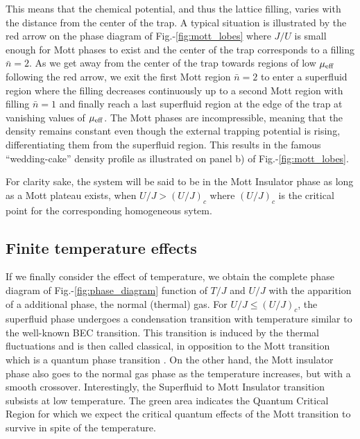 \noindent This means that the chemical potential, and thus the lattice filling, varies with the distance from the center of the trap. A typical situation is illustrated by the red arrow on the phase diagram of Fig.-\ref{fig:mott_lobes} where $J/U$ is small enough for Mott phases to exist and the center of the trap corresponds to a filling $\bar{n}=2$. As we get away from the center of the trap towards regions of low $\mu_{\rm{eff}}$ following the red arrow, we exit the first Mott region $\bar{n}=2$ to enter a superfluid region where the filling decreases continuously up to a second Mott region with filling $\bar{n}=1$ and finally reach a last superfluid region at the edge of the trap at vanishing values of $\mu_{\rm{eff}}$. The Mott phases are incompressible, meaning that the density remains constant even though the external trapping potential is rising, differentiating them from the superfluid region. This results in the famous ``wedding-cake'' density profile as illustrated on panel b) of Fig.-\ref{fig:mott_lobes}.

\noindent For clarity sake, the system will be said to be in the Mott Insulator phase as long as a Mott plateau exists, \ie when $U/J > (U/J)_c$ where $(U/J)_c$ is the critical point for the corresponding homogeneous sytem.

\subsection{Finite temperature effects}

If we finally consider the effect of temperature, we obtain the complete phase diagram of Fig.-\ref{fig:phase_diagram} function of $T/J$ and $U/J$ with the apparition of a additional phase, the normal (thermal) gas. For $U/J \leq (U/J)_c$, the superfluid phase undergoes a condensation transition with temperature similar to the well-known BEC transition. This transition is induced by the thermal fluctuations and is then called classical, in opposition to the Mott transition which is a quantum phase transition . On the other hand, the Mott insulator phase also goes to the normal gas phase as the temperature increases, but with a smooth crossover. Interestingly, the Superfluid to Mott Insulator transition subsists at low temperature. The green area indicates the Quantum Critical Region for which we expect the critical quantum effects of the Mott transition to survive in spite of the temperature.

